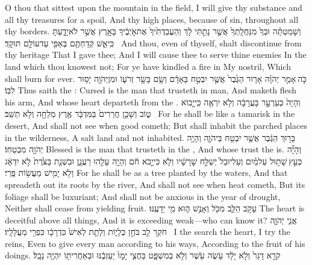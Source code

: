 {O thou that sittest upon the mountain in the field, I will give thy substance and all thy treasures for a spoil, And thy high places, because of sin, throughout all thy borders.}
{וְשָׁמַטְתָּ֗ה וּבְךָ֙ מִנַּחֲלָֽתְךָ֙ אֲשֶׁ֣ר נָתַ֣תִּי לָ֔ךְ וְהַעֲבַדְתִּ֙יךָ֙ אֶת\maqqaf אֹ֣יְבֶ֔יךָ בָּאָ֖רֶץ אֲשֶׁ֣ר לֹא\maqqaf יָדָ֑עְתָּ כִּֽי\maqqaf אֵ֛שׁ קְדַחְתֶּ֥ם בְּאַפִּ֖י עַד\maqqaf עוֹלָ֥ם תּוּקָֽד׃ \setuma }
{And thou, even of thyself, shalt discontinue from thy heritage That I gave thee; And I will cause thee to serve thine enemies In the land which thou knowest not; For ye have kindled a fire in My nostril, Which shall burn for ever.}
{כֹּ֣ה \legarmeh  אָמַ֣ר יְהֹוָ֗ה אָר֤וּר הַגֶּ֙בֶר֙ אֲשֶׁ֣ר יִבְטַ֣ח בָּאָדָ֔ם וְשָׂ֥ם בָּשָׂ֖ר זְרֹע֑וֹ וּמִן\maqqaf יְהֹוָ֖ה יָס֥וּר לִבּֽוֹ׃}
{Thus saith the \lord: Cursed is the man that trusteth in man, And maketh flesh his arm, And whose heart departeth from the \lord.}
{וְהָיָה֙ כְּעַרְעָ֣ר בָּעֲרָבָ֔ה וְלֹ֥א יִרְאֶ֖ה כִּֽי\maqqaf יָ֣בוֹא ט֑וֹב וְשָׁכַ֤ן חֲרֵרִים֙ בַּמִּדְבָּ֔ר אֶ֥רֶץ מְלֵחָ֖ה וְלֹ֥א תֵשֵֽׁב׃ \setuma }
{For he shall be like a tamarisk in the desert, And shall not see when good cometh; But shall inhabit the parched places in the wilderness, A salt land and not inhabited.}
{בָּר֣וּךְ הַגֶּ֔בֶר אֲשֶׁ֥ר יִבְטַ֖ח בַּיהֹוָ֑ה וְהָיָ֥ה יְהֹוָ֖ה מִבְטַחֽוֹ׃}
{Blessed is the man that trusteth in the \lord, And whose trust the \lord\space is.}
{וְהָיָ֞ה כְּעֵ֣ץ \legarmeh  שָׁת֣וּל עַל\maqqaf מַ֗יִם וְעַל\maqqaf יוּבַל֙ יְשַׁלַּ֣ח שׇׁרָשָׁ֔יו וְלֹ֤א  כִּי\maqqaf יָ֣בֹא חֹ֔ם וְהָיָ֥ה עָלֵ֖הוּ רַעֲנָ֑ן וּבִשְׁנַ֤ת בַּצֹּ֙רֶת֙ לֹ֣א יִדְאָ֔ג וְלֹ֥א יָמִ֖ישׁ מֵעֲשׂ֥וֹת פֶּֽרִי׃}
{For he shall be as a tree planted by the waters, And that spreadeth out its roots by the river, And shall not see when heat cometh, But its foliage shall be luxuriant; And shall not be anxious in the year of drought, Neither shall cease from yielding fruit.}
{עָקֹ֥ב הַלֵּ֛ב מִכֹּ֖ל וְאָנֻ֣שׁ ה֑וּא מִ֖י יֵדָעֶֽנּוּ׃}
{The heart is deceitful above all things, And it is exceeding weak—who can know it?}
{אֲנִ֧י יְהֹוָ֛ה חֹקֵ֥ר לֵ֖ב בֹּחֵ֣ן כְּלָי֑וֹת וְלָתֵ֤ת לְאִישׁ֙ כִּדְרָכָ֔ו כִּפְרִ֖י מַעֲלָלָֽיו׃ \setuma }
{I the \lord\space search the heart, I try the reins, Even to give every man according to his ways, According to the fruit of his doings.}
{קֹרֵ֤א דָגַר֙ וְלֹ֣א יָלָ֔ד עֹ֥שֶׂה עֹ֖שֶׁר וְלֹ֣א בְמִשְׁפָּ֑ט בַּחֲצִ֤י יָמָו֙ יַעַזְבֶ֔נּוּ וּבְאַחֲרִית֖וֹ יִהְיֶ֥ה נָבָֽל׃}
